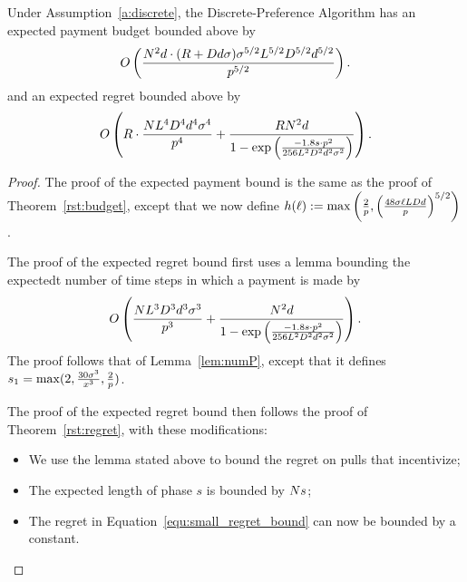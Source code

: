 
\begin{theorem}
Under Assumption~\ref{a:discrete}, the Discrete-Preference Algorithm has an expected payment budget bounded above by 
\begin{align*}
O \left(\frac{N^2 d \cdot (R + D d \sigma)\sigma^{5/2}L^{5/2}D^{5/2}d^{5/2}}{p^{5/2}} \right). 
\end{align*}
and an expected regret bounded above by 
\begin{align}
O \left(R\cdot \frac{N L^4 D^4 d^4 \sigma^4}{p^4}
  + \frac{R N^2 d}{1 - \exp \left(
    \frac{-1.8 s \cdot p^2}{256 L^2 D^2 d^2 \sigma^2}
  \right)} \right).  \nonumber
\end{align}
\end{theorem}

\begin{proof}
The proof of the expected payment bound is the same as the proof of Theorem~\ref{rst:budget}, except that we now define $h(\ell) := \max \left( \frac{2}{p},
\left( \frac{48 \sigma \ell L D d}{p} \right)^{5/2}
\right)$.

The proof of the expected regret bound first uses a lemma bounding the expectedt number of time steps in which a payment is made by 
\begin{align}
O\left(\frac{N L^3 D^3 d^3 \sigma^3}{p^3}
  + \frac{N^2 d}{1 - \exp \left(
    \frac{-1.8 s \cdot p^2}{256 L^2 D^2 d^2 \sigma^2}
  \right)} \right). \nonumber 
\end{align}
The proof follows that of Lemma~\ref{lem:numP}, except that it defines $s_1 = \max (2, \frac{30 \sigma^3}{x^3}, \frac{2}{p})$.

The proof of the expected regret bound then follows the proof of Theorem~\ref{rst:regret}, with these modifications:
\begin{itemize}
\item We use the lemma stated above to bound the regret on pulls that incentivize;
\item The expected length of phase $s$ is bounded by $N s$;
\item The regret in Equation~\ref{equ:small_regret_bound} can now be bounded by a constant.
\end{itemize}
\end{proof}




